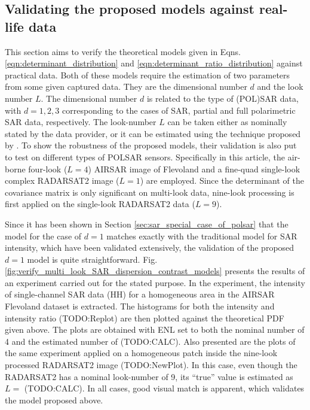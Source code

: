 \documentclass[journal]{IEEEtran}
\begin{document}
\subsection{Validating the proposed models against real-life data}
\label{sec:polsar_models_validation}

This section aims to verify the theoretical models given in Eqns. \ref{eqn:determinant_distribution} and \ref {eqn:determinant_ratio_distribution} against practical data.
Both of these models require the estimation of two parameters from some given captured data.
They are the dimensional number $d$ and the look number $L$.
The dimensional number $d$ is related to the type of (POL)SAR data,
  with $d=1,2,3$ corresponding to the cases of SAR, partial and full polarimetric SAR data, respectively.
The look-number $L$ can be taken either as nominally stated by the data provider,
  or it can be estimated using the technique proposed by \cite{Anfinsen_2009_TGRS_3795}.
To show the robustness of the proposed models, their validation is also put to test on different types of POLSAR sensors.
Specifically in this article, the air-borne four-look ($L=4$) AIRSAR image of Flevoland and
  a fine-quad single-look complex RADARSAT2 image ($L=1$) are employed.
Since the determinant of the covariance matrix is only significant on multi-look data,
  nine-look processing is first applied on the single-look RADARSAT2 data ($L=9$).

Since it has been shown in Section \ref{sec:sar_special_case_of_polsar} that the model for the case of $d=1$ matches exactly with the traditional model for SAR intensity,
  which have been validated extensively, the validation of the proposed $d=1$ model is quite straightforward. %
Fig. \ref{fig:verify_multi_look_SAR_dispersion_contrast_models} presents the results of an experiment carried out for the stated purpose.
In the experiment, the intensity of single-channel SAR data (HH) for a homogeneous area in the AIRSAR Flevoland dataset is extracted.
The histograms for both the intensity and intensity ratio (TODO:Replot) %
  are then plotted against the theoretical PDF given above.
The plots are obtained with ENL set to both the nominal number of 4 and the estimated number of (TODO:CALC).
Also presented are the plots of the same experiment applied on a homogeneous patch inside the nine-look processed RADARSAT2 image (TODO:NewPlot).
In this case, even though the RADARSAT2 has a nominal look-number of 9, its ``true'' value is estimated as $L=$ (TODO:CALC).
In all cases, good visual match is apparent, which validates the model proposed above. %
\end{document}

